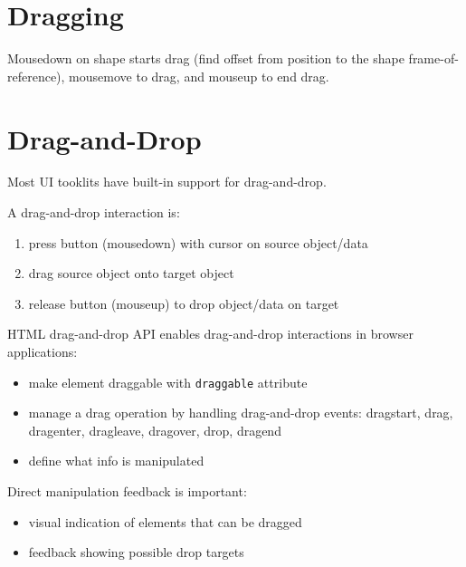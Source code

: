 \documentclass[11pt]{article}
\begin{document}
\section{Dragging}
\label{sec:org13a59c6}
Mousedown on shape starts drag (find offset from position to the shape frame-of-reference),
mousemove to drag, and mouseup to end drag.
\section{Drag-and-Drop}
\label{sec:orgd6f0363}
Most UI tooklits have built-in support for drag-and-drop.

A drag-and-drop interaction is:
\begin{enumerate}
\item press button (mousedown) with cursor on source object/data
\item drag source object onto target object
\item release button (mouseup) to drop object/data on target
\end{enumerate}

HTML drag-and-drop API enables drag-and-drop interactions in browser applications:
\begin{itemize}
\item make element draggable with \texttt{draggable} attribute
\item manage a drag operation by handling drag-and-drop events: dragstart, drag, dragenter,
dragleave, dragover, drop, dragend
\item define what info is manipulated
\end{itemize}

Direct manipulation feedback is important:
\begin{itemize}
\item visual indication of elements that can be dragged
\item feedback showing possible drop targets
\end{itemize}
\end{document}
